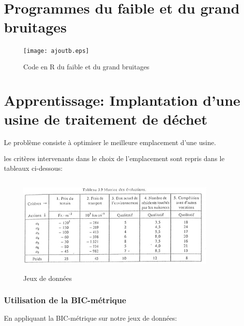 \documentclass[a4paper]{article}
\begin{document}
\newpage
\begin{appendices}
\section{Programmes du faible et du grand bruitages} 
\label{programme}
\begin{figure}[H] 
    \center 
   \texttt{[image: ajoutb.eps]} 
    \caption{Code en R du faible et du grand bruitages} 
\end{figure} 

\newpage

\section{Apprentissage: Implantation d'une usine de traitement de déchet}

\label{apprentissage_usine}
Le problème consiste à optimiser le meilleure emplacement d'une usine.

les critères intervenants dans le choix de l'emplacement sont repris dans le tableaux ci-dessous:
\begin{figure}[H] 
    \center 
    \includegraphics[width=10cm,height=5cm]{CasMaystr.eps} 
    \caption{Jeux de données} 
\end{figure} 


\subsubsection{Utilisation de la BIC-métrique}
En appliquant la BIC-métrique sur notre jeux de données:


\end{appendices}
\end{document}
